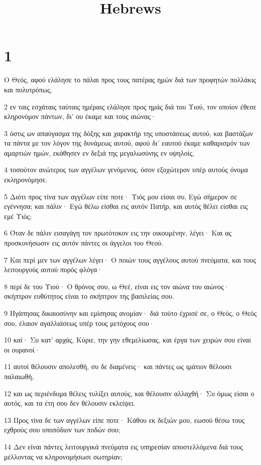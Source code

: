 

\title{Hebrews}


\chapter{1}

\par Ο Θεός, αφού ελάλησε το πάλαι προς τους πατέρας ημών διά των προφητών πολλάκις και πολυτρόπως,
\par 2 εν ταις εσχάταις ταύταις ημέραις ελάλησε προς ημάς διά του Υιού, τον οποίον έθεσε κληρονόμον πάντων, δι' ου έκαμε και τους αιώνας·
\par 3 όστις ων απαύγασμα της δόξης και χαρακτήρ της υποστάσεως αυτού, και βαστάζων τα πάντα με τον λόγον της δυνάμεως αυτού, αφού δι' εαυτού έκαμε καθαρισμόν των αμαρτιών ημών, εκάθησεν εν δεξιά της μεγαλωσύνης εν υψηλοίς,
\par 4 τοσούτον ανώτερος των αγγέλων γενόμενος, όσον εξοχώτερον υπέρ αυτούς όνομα εκληρονόμησε.
\par 5 Διότι προς τίνα των αγγέλων είπε ποτε· Υιός μου είσαι συ, Εγώ σήμερον σε εγέννησα; και πάλιν· Εγώ θέλω είσθαι εις αυτόν Πατήρ, και αυτός θέλει είσθαι εις εμέ Υιός;
\par 6 Όταν δε πάλιν εισαγάγη τον πρωτότοκον εις την οικουμένην, λέγει· Και ας προσκυνήσωσιν εις αυτόν πάντες οι άγγελοι του Θεού.
\par 7 Και περί μεν των αγγέλων λέγει· Ο ποιών τους αγγέλους αυτού πνεύματα, και τους λειτουργούς αυτού πυρός φλόγα·
\par 8 περί δε του Υιού· Ο θρόνος σου, ω Θεέ, είναι εις τον αιώνα του αιώνος· σκήπτρον ευθύτητος είναι το σκήπτρον της βασιλείας σου.
\par 9 Ηγάπησας δικαιοσύνην και εμίσησας ανομίαν· διά τούτο έχρισέ σε, ο Θεός, ο Θεός σου, έλαιον αγαλλιάσεως υπέρ τους μετόχους σου·
\par 10 καί· Συ κατ' αρχάς, Κύριε, την γην εθεμελίωσας, και έργα των χειρών σου είναι οι ουρανοί·
\par 11 αυτοί θέλουσιν απολεσθή, συ δε διαμένεις· και πάντες ως ιμάτιον θέλουσι παλαιωθή,
\par 12 και ως περιένδυμα θέλεις τυλίξει αυτούς, και θέλουσιν αλλαχθή· Συ όμως είσαι ο αυτός, και τα έτη σου δεν θέλουσιν εκλείψει.
\par 13 Προς τίνα δε των αγγέλων είπε ποτε· Κάθου εκ δεξιών μου, εωσού θέσω τους εχθρούς σου υποπόδιον των ποδών σου;
\par 14 Δεν είναι πάντες λειτουργικά πνεύματα εις υπηρεσίαν αποστελλόμενα διά τους μέλλοντας να κληρονομήσωσι σωτηρίαν;


